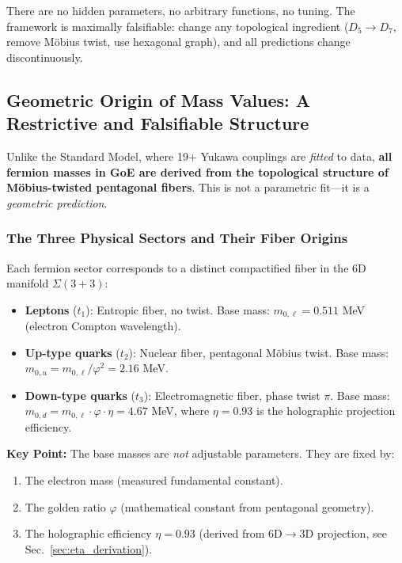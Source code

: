 \documentclass[12pt]{article}
\begin{document}
There are no hidden parameters, no arbitrary functions, no tuning. The framework is maximally falsifiable: change any topological ingredient ($D_5 \to D_7$, remove M\"obius twist, use hexagonal graph), and all predictions change discontinuously.

\subsection{Geometric Origin of Mass Values: A Restrictive and Falsifiable Structure}
\label{sec:geometric_origin}

Unlike the Standard Model, where 19+ Yukawa couplings are \textit{fitted} to data, \textbf{all fermion masses in GoE are derived from the topological structure of M\"obius-twisted pentagonal fibers}. This is not a parametric fit—it is a \textit{geometric prediction}.

\subsubsection{The Three Physical Sectors and Their Fiber Origins}

Each fermion sector corresponds to a distinct compactified fiber in the 6D manifold $\Sigma(3+3)$:

\begin{itemize}
\item \textbf{Leptons} ($t_1$): Entropic fiber, no twist. Base mass: $m_{0,\ell} = 0.511$ MeV (electron Compton wavelength).
\item \textbf{Up-type quarks} ($t_2$): Nuclear fiber, pentagonal M\"obius twist. Base mass: $m_{0,u} = m_{0,\ell}/\varphi^2 = 2.16$ MeV.
\item \textbf{Down-type quarks} ($t_3$): Electromagnetic fiber, phase twist $\pi$. Base mass: $m_{0,d} = m_{0,\ell} \cdot \varphi \cdot \eta = 4.67$ MeV, where $\eta = 0.93$ is the holographic projection efficiency.
\end{itemize}

\textbf{Key Point:} The base masses are \textit{not} adjustable parameters. They are fixed by:
\begin{enumerate}
\item The electron mass (measured fundamental constant).
\item The golden ratio $\varphi$ (mathematical constant from pentagonal geometry).
\item The holographic efficiency $\eta = 0.93$ (derived from 6D$\to$3D projection, see Sec.~\ref{sec:eta_derivation}).
\end{enumerate}
\end{document}
